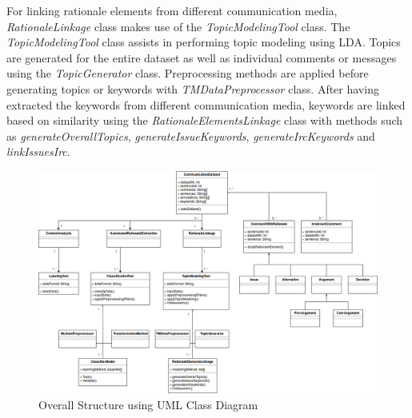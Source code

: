 \documentclass[a4paper,12pt,twoside]{report}
\begin{document}
\newline \newline
For linking rationale elements from different communication media, \textit{RationaleLinkage} class makes use of the \textit{TopicModelingTool} class. The \textit{TopicModelingTool} class assists in performing topic modeling using \acs{LDA}. Topics are generated for the entire dataset as well as individual comments or messages using the \textit{TopicGenerator} class. Preprocessing methods are applied before generating topics or keywords with \textit{TMDataPreprocessor} class. After having extracted the keywords from different communication media, keywords are linked based on similarity using the \textit{RationaleElementsLinkage} class with methods such as \textit{generateOverallTopics}, \textit{generateIssueKeywords}, \textit{generateIrcKeywords} and \textit{linkIssuesIrc}.
\begin{figure} %
    \centering
    \includegraphics[width=20cm]{Overall-Class-Diagram}
    \caption{Overall Structure using UML Class Diagram}
    \label{fig:overallClassDiagram}
\end{figure}
\end{document}
